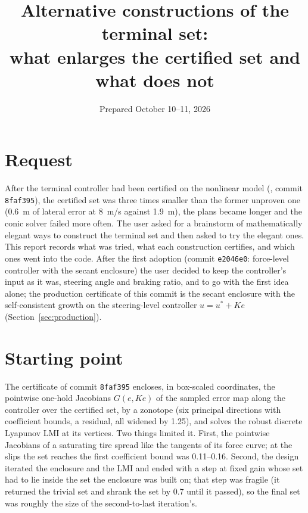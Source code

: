 \documentclass[11pt]{article}
\title{Alternative constructions of the terminal set:\\ what enlarges the certified set and what does not}
\date{Prepared October 10--11, 2026}
\begin{document}
\maketitle

\section{Request}
After the terminal controller had been certified on the nonlinear model
(, commit
\texttt{8faf395}), the certified set was three times smaller than the former
unproven one (0.6~m of lateral error at 8~m/s against 1.9~m), the plans
became longer and the conic solver failed more often. The user asked for a
brainstorm of mathematically elegant ways to construct the terminal set and
then asked to try the elegant ones. This report records what was tried, what
each construction certifies, and which ones went into the code. After the
first adoption (commit \texttt{e2046e0}: force-level controller with the
secant enclosure) the user decided to keep the controller's input as it was,
steering angle and braking ratio, and to go with the first idea alone; the
production certificate of this commit is the secant enclosure with the
self-consistent growth on the steering-level controller $u=u^*+Ke$
(Section~\ref{sec:production}).

\section{Starting point}
The certificate of commit \texttt{8faf395} encloses, in box-scaled
coordinates, the pointwise one-hold Jacobians $G(e,Ke)$ of the sampled error
map along the controller over the certified set, by a zonotope (six principal
directions with coefficient bounds, a residual, all widened by 1.25), and
solves the robust discrete Lyapunov LMI at its vertices. Two things limited
it. First, the pointwise Jacobians of a saturating tire spread like the
tangents of its force curve; at the slips the set reaches the first
coefficient bound was 0.11--0.16. Second, the design iterated the enclosure
and the LMI and ended with a step at fixed gain whose set had to lie inside
the set the enclosure was built on; that step was fragile (it returned the
trivial set and shrank the set by 0.7 until it passed), so the final set was
roughly the size of the second-to-last iteration's.
\end{document}
